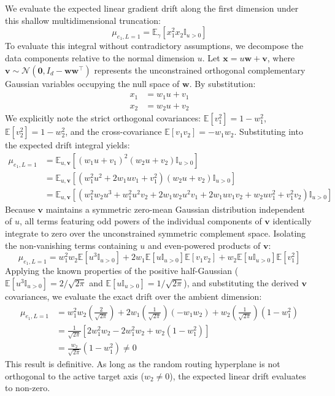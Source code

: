 \documentclass{article}
\newcommand{\E}{\mathbb{E}}
\newcommand{\1}{\mathbb{I}}
\newcommand{\bx}{\mathbf{x}}
\newcommand{\bw}{\mathbf{w}}
\newcommand{\bv}{\mathbf{v}}
\newcommand{\calN}{\mathcal{N}}
\begin{document}
We evaluate the expected linear gradient drift along the first dimension under this shallow multidimensional truncation:
\begin{equation}
    \mu_{e_1, L=1} = \E_{\gamma}[x_1^2 x_2 \1_{u > 0}]
\end{equation}
To evaluate this integral without contradictory assumptions, we decompose the data components relative to the normal dimension $u$. Let $\bx = u\bw + \bv$, where $\bv \sim \calN(\mathbf{0}, I_d - \bw\bw^\top)$ represents the unconstrained orthogonal complementary Gaussian variables occupying the null space of $\bw$. By substitution:
\begin{align}
    x_1 &= w_1 u + v_1 \\
    x_2 &= w_2 u + v_2 
\end{align}
We explicitly note the strict orthogonal covariances: $\E[v_1^2] = 1 - w_1^2$, $\E[v_2^2] = 1 - w_2^2$, and the cross-covariance $\E[v_1 v_2] = -w_1 w_2$. Substituting into the expected drift integral yields:
\begin{align}
    \mu_{e_1, L=1} &= \E_{u, \bv} \left[ (w_1 u + v_1)^2 (w_2 u + v_2) \1_{u>0} \right] \nonumber \\
    &= \E_{u, \bv} \left[ (w_1^2 u^2 + 2w_1 u v_1 + v_1^2) (w_2 u + v_2) \1_{u>0} \right] \nonumber \\
    &= \E_{u, \bv} \left[ \left( w_1^2 w_2 u^3 + w_1^2 u^2 v_2 + 2w_1 w_2 u^2 v_1 + 2w_1 u v_1 v_2 + w_2 u v_1^2 + v_1^2 v_2 \right) \1_{u>0} \right]
\end{align}
Because $\bv$ maintains a symmetric zero-mean Gaussian distribution independent of $u$, all terms featuring odd powers of the individual components of $\bv$ identically integrate to zero over the unconstrained symmetric complement space. Isolating the non-vanishing terms containing $u$ and even-powered products of $\bv$:
\begin{equation}
    \mu_{e_1, L=1} = w_1^2 w_2 \E[u^3 \1_{u>0}] + 2 w_1 \E[u \1_{u>0}] \E[v_1 v_2] + w_2 \E[u \1_{u>0}] \E[v_1^2]
\end{equation}
Applying the known properties of the positive half-Gaussian ($\E[u^3 \1_{u>0}] = 2/\sqrt{2\pi}$ and $\E[u \1_{u>0}] = 1/\sqrt{2\pi}$), and substituting the derived $\bv$ covariances, we evaluate the exact drift over the ambient dimension:
\begin{align}
    \mu_{e_1, L=1} &= w_1^2 w_2 \left(\frac{2}{\sqrt{2\pi}}\right) + 2 w_1 \left(\frac{1}{\sqrt{2\pi}}\right) (-w_1 w_2) + w_2 \left(\frac{1}{\sqrt{2\pi}}\right) (1 - w_1^2) \nonumber \\
    &= \frac{1}{\sqrt{2\pi}} \left[ 2 w_1^2 w_2 - 2 w_1^2 w_2 + w_2(1 - w_1^2) \right] \nonumber \\
    &= \frac{w_2}{\sqrt{2\pi}} (1 - w_1^2) \neq 0
\end{align}
This result is definitive. As long as the random routing hyperplane is not orthogonal to the active target axis ($w_2 \neq 0$), the expected linear drift evaluates to non-zero. 
\end{document}
